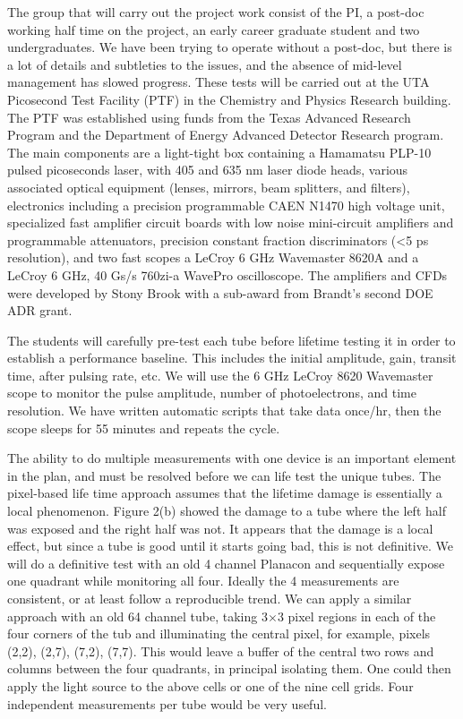 
The group that will carry out the project work consist of the PI, a post-doc working half time on the project, an early career graduate student and two undergraduates. We have been trying to operate without a post-doc, but there is a lot of details and subtleties to the issues, and the absence of mid-level management has slowed progress.  These tests will be carried out at the UTA Picosecond Test Facility (PTF) in the Chemistry and Physics Research building.  The PTF was established using funds from the Texas Advanced Research Program and the Department of Energy Advanced Detector Research program.  The main components are a light-tight box containing a Hamamatsu PLP-10 pulsed picoseconds laser, with 405 and 635 nm laser diode heads, various associated optical equipment (lenses, mirrors, beam splitters, and filters), electronics including a precision programmable CAEN N1470 high voltage unit, specialized fast amplifier circuit boards with low noise mini-circuit amplifiers and programmable attenuators, precision constant fraction discriminators (<5 ps resolution),  and two fast scopes a LeCroy 6 GHz Wavemaster 8620A and a LeCroy 6 GHz, 40 Gs/s 760zi-a WavePro oscilloscope.   The amplifiers and CFDs were developed by Stony Brook with a sub-award from Brandt's second DOE ADR grant. 

The students will carefully pre-test each tube before lifetime testing it in order to establish a performance baseline. This includes the initial amplitude, gain, transit time, after pulsing rate, etc. We will use the 6 GHz LeCroy 8620 Wavemaster scope to monitor the pulse amplitude, number of photoelectrons, and time resolution. We have written automatic scripts that take data once/hr, then the scope sleeps for 55 minutes and repeats the cycle.  

The ability to do multiple measurements with one device is an important element in the plan, and must be resolved before we can life test the unique tubes. The pixel-based life time approach assumes that the lifetime damage is essentially a local phenomenon. Figure 2(b) showed the damage to a tube where the left half was exposed and the right half was not.  It appears that the damage is a local effect, but since a tube is good until it starts going bad, this is not definitive. We will do a definitive test  with an old 4 channel Planacon and sequentially expose one quadrant while monitoring all four.  Ideally the 4 measurements are consistent, or at least follow a reproducible trend. We can apply a similar approach with an old 64 channel tube, taking  3$\times$3 pixel regions in each of the four corners of the tub and illuminating the central pixel, for example,  pixels (2,2),  (2,7), (7,2), (7,7). This would leave a buffer of the central two rows and columns between the four quadrants, in principal isolating them.  One could then apply the light source to the above cells or one of the nine cell grids. Four independent measurements per tube would be very useful.   

